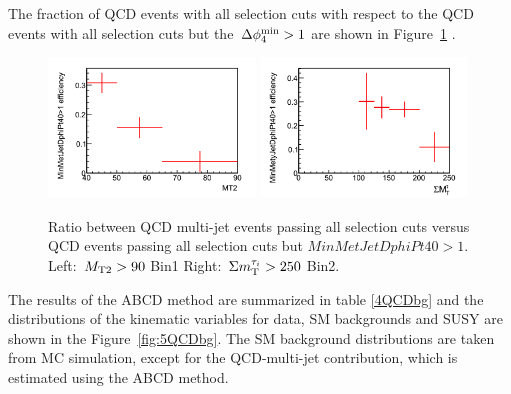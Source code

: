The fraction of QCD events with all selection cuts with respect to the QCD events with all selection cuts but the
$\,{\Delta\phi_{4}^{\rm min}}>1$ are shown in Figure~\ref{fig:3QCDbg} .

\begin{figure}[htbp]
\centering
\includegraphics[width=0.49\textwidth]{QCDbginTauTau/Bin1_miscefficiency.png}
\includegraphics[width=0.49\textwidth]{QCDbginTauTau/Bin2_miscefficiency.png} \\
\caption{ Ratio between QCD multi-jet events passing all selection cuts versus QCD events
 passing all selection cuts but $MinMetJetDphiPt40>1$. Left:  $\,{M_{\rm T2}}>90$ Bin1   Right:  $\,\Sigma m_{\rm T}^{\tau_i} >250$ Bin2.}
\label{fig:3QCDbg}
\end{figure}




The results of the ABCD method are summarized in table \ref{4QCDbg} and the distributions of the kinematic variables  for data, SM backgrounds and SUSY are shown in the Figure~\ref{fig:5QCDbg}. The SM background distributions
are taken from MC simulation, except for the QCD-multi-jet contribution, which is estimated
using the ABCD method.



